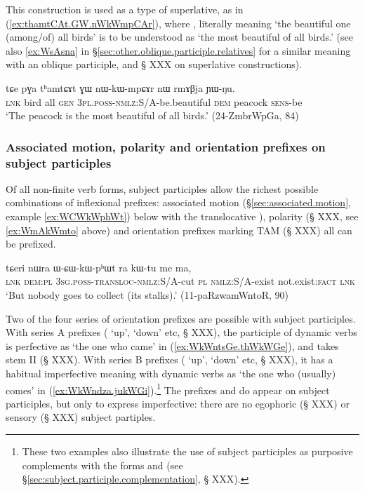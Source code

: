 This construction is used as a type of superlative, as in (\ref{ex:thamtCAt.GW.nWkWmpCAr}), where , literally meaning `the beautiful one (among/of) all birds' is to be understood as `the most beautiful of all birds.' (see also \ref{ex:WsAsna} in §\ref{sec:other.oblique.participle.relatives} for a similar meaning with an oblique participle, and § XXX on superlative constructions).

 \begin{exe} 
\ex \label{ex:thamtCAt.GW.nWkWmpCAr}
\gll tɕe pɣa tʰamtɕɤt ɣɯ nɯ-kɯ-mpɕɤr nɯ rmɤβja ɲɯ-ŋu.  \\
\textsc{lnk} bird all \textsc{gen} \textsc{3pl}.\textsc{poss}-\textsc{nmlz}:S/A-be.beautiful \textsc{dem} peacock \textsc{sens}-be \\
\glt `The peacock is the most beautiful of all birds.' (24-ZmbrWpGa, 84)
\end{exe}

\subsubsection{Associated motion, polarity and orientation prefixes on subject participles}  \label{sec:subject.participle.other.prefixes}
Of all non-finite verb forms, subject participles allow the richest possible combinations of inflexional prefixes: associated motion (§\ref{sec:associated.motion}, example \ref{ex:WCWkWphWt}) below with the translocative ), polarity (§ XXX, see \ref{ex:WmAkWmto} above) and orientation prefixes marking TAM (§ XXX) all can be prefixed. 
 
\begin{exe}
\ex \label{ex:WCWkWphWt}
 \gll tɕeri nɯra ɯ-ɕɯ-kɯ-pʰɯt ra kɯ-tu me ma,   \\
 \textsc{lnk} \textsc{dem}:\textsc{pl} \textsc{3sg}.\textsc{poss}-\textsc{transloc}-\textsc{nmlz}:S/A-cut \textsc{pl} \textsc{nmlz}:S/A-exist not.exist:\textsc{fact} \textsc{lnk} \\
 \glt `But nobody goes to collect (its stalks).' (11-paRzwamWntoR, 90)
\end{exe}

Two of the four series of orientation prefixes are possible with subject participles. With series A prefixes ( `up',  `down' etc, § XXX), the participle of dynamic verbs is perfective as  `the one who came' in (\ref{ex:WkWntsGe.thWkWGe}), and takes stem II (§ XXX). With series B prefixes ( `up',  `down' etc, § XXX), it has a habitual imperfective meaning with dynamic verbs as  `the one who (usually) comes' in (\ref{ex:WkWndza.jukWGi}).\footnote{These two examples also illustrate the use of subject participles as purposive complements with the forms  and  (see §\ref{sec:subject.participle.complementation}, § XXX).} The prefixes and  do appear on subject participles, but only to express imperfective: there are no egophoric (§ XXX) or sensory (§ XXX) subject partiples.

